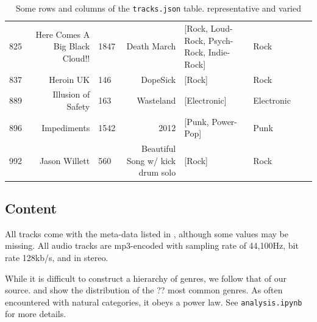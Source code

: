 \documentclass{article}
\newcommand{\todo}[1]{{\color{red} #1 }}
\begin{document}
\begin{table}
\begin{tabular}{lrlrllll}
		 825 &                     Here Comes A Big Black Cloud!! &        1847 &                                        Death March &          [Rock, Loud-Rock, Psych-Rock, Indie-Rock] &                 Rock  \\
		837 &                                          Heroin UK &         146 &                                           DopeSick &                                             [Rock] &                 Rock \\
		 889 &                                 Illusion of Safety &         163 &                                          Wasteland &                                       [Electronic] &           Electronic  \\
		 896 &                                        Impediments &        1542 &                                               2012 &                                  [Punk, Power-Pop] &                 Punk  \\
			  992 &                                      Jason Willett &         560 &                   Beautiful Song w/ kick drum solo &                                             [Rock] &                 Rock  \\
	\bottomrule
	\end{tabular}
	\caption{Some rows and columns of the \texttt{tracks.json} table. \todo{representative and varied}}
	\label{tab:tracks}
\end{table}

\subsection{Content} \label{sec:content}

All tracks come with the meta-data listed in , although some values may be missing.
All audio tracks are mp3-encoded with sampling rate of 44,100Hz, bit rate 128kb/s, and in stereo. 


While it is difficult to construct a hierarchy of genres, we follow that of our source.  and  show the distribution of the \todo{??} most common genres. As often encountered with natural categories, it obeys a power law.
See \texttt{analysis.ipynb} for more details.
\end{document}
